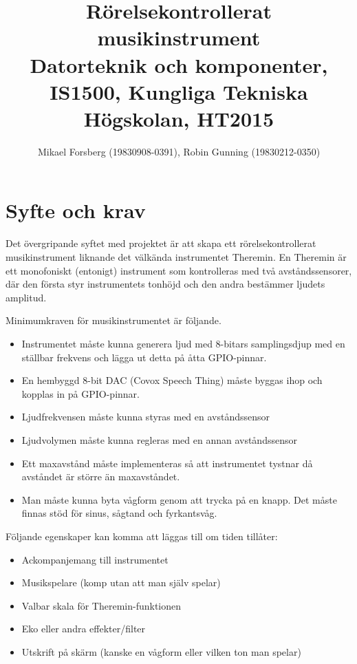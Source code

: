 \documentclass[a4paper,11pt]{article}
\begin{document}
\title{\vspace{-1cm} Rörelsekontrollerat musikinstrument\\ \vspace{0.2cm} \small Datorteknik och komponenter, IS1500, Kungliga Tekniska Högskolan, HT2015}
\author{Mikael Forsberg (19830908-0391), Robin Gunning (19830212-0350)}
\maketitle

\section*{Syfte och krav}
Det övergripande syftet med projektet är att skapa ett rörelsekontrollerat musikinstrument liknande det välkända instrumentet Theremin. En Theremin är ett monofoniskt (entonigt) instrument som kontrolleras med två avståndssensorer, där den första styr instrumentets tonhöjd och den andra bestämmer ljudets amplitud. 

\bigskip
\noindent
Minimumkraven för musikinstrumentet är följande.
\begin{itemize}
\item Instrumentet måste kunna generera ljud med 8-bitars samplingsdjup med en ställbar frekvens och lägga ut detta på åtta GPIO-pinnar.
\item En hembyggd 8-bit DAC (Covox Speech Thing) måste byggas ihop och kopplas in på GPIO-pinnar.
\item Ljudfrekvensen måste kunna styras med en avståndssensor
\item Ljudvolymen måste kunna regleras med en annan avståndssensor
\item Ett maxavstånd måste implementeras så att instrumentet tystnar då avståndet är större än maxavståndet.
\item Man måste kunna byta vågform genom att trycka på en knapp. Det måste finnas stöd för sinus, sågtand och fyrkantsvåg.
\end{itemize}

\bigskip
\noindent
Följande egenskaper kan komma att läggas till om tiden tillåter:
\begin{itemize}
\item Ackompanjemang till instrumentet
\item Musikspelare (komp utan att man själv spelar)
\item Valbar skala för Theremin-funktionen
\item Eko eller andra effekter/filter
\item Utskrift på skärm (kanske en vågform eller vilken ton man spelar)
\end{itemize}
\end{document}
